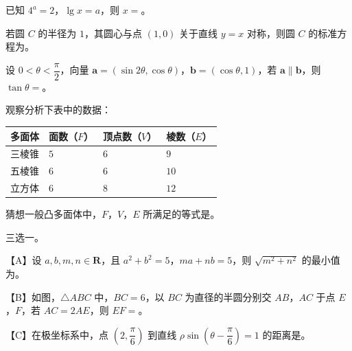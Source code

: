 \begin{question}
已知 $4^a=2$，$\lg x=a$，则 $x=$\gkblank{}。

\end{question}
\begin{question}
若圆 $C$ 的半径为 $1$，其圆心与点 $(1,0)$ 关于直线 $y=x$ 对称，则圆 $C$ 的标准方程为\gkblank{}。

\end{question}
\begin{question}
设 $0<\theta<\dfrac\pi2$，向量 $\boldsymbol a=(\sin2\theta,\cos\theta)$，$\boldsymbol b=(\cos\theta,1)$，若 $\boldsymbol a\parallel\boldsymbol b$，则 $\tan\theta=$\gkblank{}。

\end{question}
\begin{question}
观察分析下表中的数据：

\begin{center}
\begin{tabular}{llll}
\toprule
多面体 & 面数（$F$） & 顶点数（$V$） & 棱数（$E$） \\
\midrule
三棱锥 & $5$ & $6$ & $9$ \\
五棱锥 & $6$ & $6$ & $10$ \\
立方体 & $6$ & $8$ & $12$ \\
\bottomrule
\end{tabular}
\end{center}

猜想一般凸多面体中，$F$，$V$，$E$ 所满足的等式是\gkblank{}。

\Needspace{0.4\textheight}
\end{question}
\begin{question}
三选一。

【A】设 $a,b,m,n\in\mathbf R$，且 $a^2+b^2=5$，$ma+nb=5$，则 $\sqrt{m^2+n^2}$ 的最小值为\gkblank{}。

【B】如图，$\triangle ABC$ 中，$BC=6$，以 $BC$ 为直径的半圆分别交 $AB$，$AC$ 于点 $E$，$F$，若 $AC=2AE$，则 $EF=$\gkblank{}。
\nopagebreak[4]
\begin{center}\end{center}
\nopagebreak[4]
【C】在极坐标系中，点 $\left(2,\dfrac\pi6\right)$ 到直线 $\rho\sin\left(\theta-\dfrac\pi6\right)=1$ 的距离是\gkblank{}。

\end{question}

